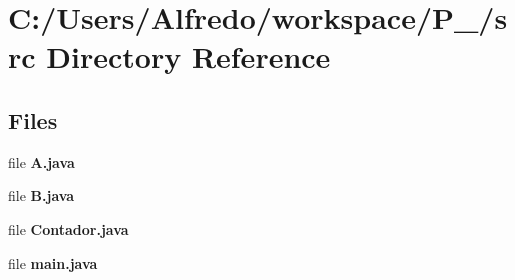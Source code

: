 \section{C\+:/\+Users/\+Alfredo/workspace/\+P\+\_/src Directory Reference}
\label{dir_7d0037a57bd470ccea7b17ac999d49b1}
\subsection*{Files}
\begin{DoxyCompactItemize}
\item 
file {\bf A.\+java}
\item 
file {\bf B.\+java}
\item 
file {\bf Contador.\+java}
\item 
file {\bf main.\+java}
\end{DoxyCompactItemize}

